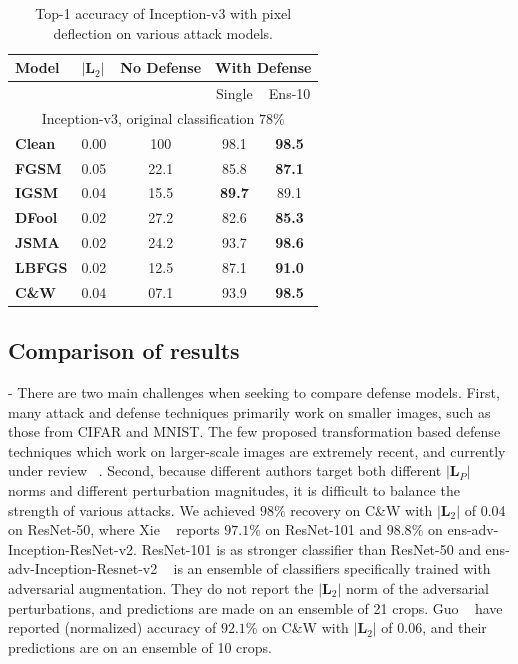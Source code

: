  
 \begin{table}[H]
\centering
{}
\begin{tabular}{lcccc}
\textbf{Model} & \multicolumn{1}{l}{$|\boldsymbol{L}_2|$} & \multicolumn{1}{l}{\textbf{No Defense}} & \multicolumn{2}{l}{\textbf{With Defense}} \\ \hline
 & \multicolumn{1}{l}{} & \multicolumn{1}{l}{} & Single & Ens-10 \\ \cline{4-5} 
 \multicolumn{5}{c}{Inception-v3, original classification $78\%$} \\ \hline

\textbf{Clean} & 0.00 & 100 & 98.1 & \textbf{98.5} \\ \hline
\textbf{FGSM} & 0.05 & 22.1 & 85.8 & \textbf{87.1} \\
\textbf{IGSM} & 0.04 & 15.5 & \textbf{89.7} & 89.1 \\
\textbf{DFool} & 0.02 & 27.2 & 82.6 & \textbf{85.3} \\
\textbf{JSMA} & 0.02 & 24.2 & 93.7 & \textbf{98.6} \\
\textbf{LBFGS} & 0.02 & 12.5 & 87.1 & \textbf{91.0} \\
\textbf{C\&W} & 0.04 & 07.1 & 93.9 & \textbf{98.5} \\
\end{tabular}
\caption[Inception-v3 under Pixel Deflection]{Top-1 accuracy of Inception-v3 with pixel deflection on various attack models. 
 \label{tblmodels2}}
\end{table}

\subsection{Comparison of results} - 
There are two main challenges when seeking to compare defense models. 
First, many attack and defense techniques primarily work on smaller images, such as those from CIFAR and MNIST.
The few proposed transformation based defense techniques which work on larger-scale images are extremely recent, and currently under review ~\cite{MitigatingAnon208,CounteringAIGuo17}.
Second, because different authors target both different $|\bm{L}_P|$ norms and different perturbation magnitudes, it is difficult to balance the strength of various attacks.
We achieved $98\%$ recovery on C\&W with $|\bm{L}_2|$ of 0.04 on ResNet-50, where Xie \etal ~\cite{MitigatingAnon208} reports $97.1\%$ on ResNet-101 and $98.8\%$ on ens-adv-Inception-ResNet-v2.
ResNet-101 is as stronger classifier than ResNet-50 and ens-adv-Inception-Resnet-v2 ~\cite{Tramr2017EnsembleAT} is an ensemble of classifiers specifically trained with adversarial augmentation. 
They do not report the $|\bm{L}_2|$ norm of the adversarial perturbations, and predictions are made on an ensemble of 21 crops.
Guo \etal ~\cite{CounteringAIGuo17} have reported (normalized) accuracy of $92.1\%$ on C\&W with $|\bm{L}_2|$ of 0.06, and their predictions are on an ensemble of 10 crops.

